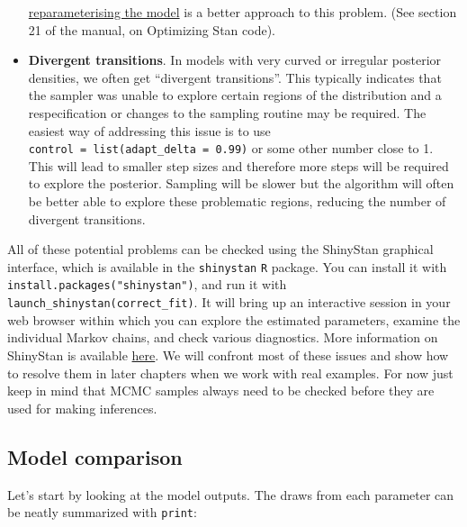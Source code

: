 \documentclass[]{book}
\begin{document}
\begin{itemize}
  \href{http://mc-stan.org/documentation/}{reparameterising the model}
  is a better approach to this problem. (See section 21 of the manual,
  on Optimizing Stan code).
\item
  \textbf{Divergent transitions}. In models with very curved or
  irregular posterior densities, we often get ``divergent transitions''.
  This typically indicates that the sampler was unable to explore
  certain regions of the distribution and a respecification or changes
  to the sampling routine may be required. The easiest way of addressing
  this issue is to use \texttt{control\ =\ list(adapt\_delta\ =\ 0.99)}
  or some other number close to 1. This will lead to smaller step sizes
  and therefore more steps will be required to explore the posterior.
  Sampling will be slower but the algorithm will often be better able to
  explore these problematic regions, reducing the number of divergent
  transitions.
\end{itemize}

All of these potential problems can be checked using the ShinyStan
graphical interface, which is available in the \texttt{shinystan}
\texttt{R} package. You can install it with
\texttt{install.packages("shinystan")}, and run it with
\texttt{launch\_shinystan(correct\_fit)}. It will bring up an
interactive session in your web browser within which you can explore the
estimated parameters, examine the individual Markov chains, and check
various diagnostics. More information on ShinyStan is available
\href{http://mc-stan.org/interfaces/shinystan}{here}. We will confront
most of these issues and show how to resolve them in later chapters when
we work with real examples. For now just keep in mind that MCMC samples
always need to be checked before they are used for making inferences.

\subsection{Model comparison}\label{model-comparison}

Let's start by looking at the model outputs. The draws from each
parameter can be neatly summarized with \texttt{print}:
\end{document}
